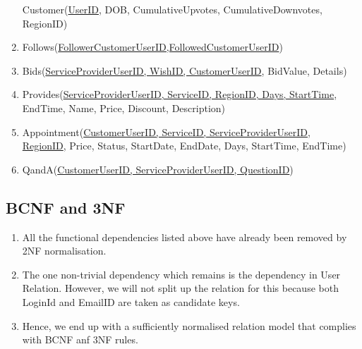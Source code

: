 \documentclass[a4paper]{article}
\begin{document}
\begin{enumerate}
\subitem Customer(\underline{UserID}, DOB, CumulativeUpvotes, CumulativeDownvotes, RegionID)

\item Follows(\underline{FollowerCustomerUserID,FollowedCustomerUserID})
\item Bids(\underline{ServiceProviderUserID, WishID, CustomerUserID}, BidValue, Details)
\item Provides(\underline{ServiceProviderUserID, ServiceID, RegionID, Days, StartTime}, EndTime, Name, Price, Discount, Description)
\item Appointment(\underline{CustomerUserID, ServiceID, ServiceProviderUserID},\\ \underline{RegionID}, Price, Status, StartDate, EndDate, Days, StartTime, EndTime)  
\item QandA(\underline{CustomerUserID, ServiceProviderUserID, QuestionID})

\end{enumerate}


\subsection{BCNF and 3NF}
\begin{enumerate}
\item All the functional dependencies listed above have already been removed by 2NF normalisation.
\item The one non-trivial dependency which remains is the dependency in User Relation. However, we will not split up the relation for this because both LoginId and EmailID are taken as candidate keys.
\item Hence, we end up with a sufficiently normalised relation model that complies with BCNF anf 3NF rules.
\end{enumerate}
\end{document}
